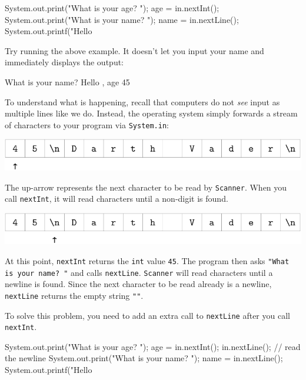 \documentclass[12pt]{book}
\theoremstyle{exercise}
\newcommand{\java}[1]{\lstinline{#1}} %
\begin{document}
\begin{code}
    System.out.print("What is your age? ");
    age = in.nextInt();
    System.out.print("What is your name? ");
    name = in.nextLine();
    System.out.printf("Hello %
\end{code}

Try running the above example.
It doesn't let you input your name and immediately displays the output:

\begin{stdout}
What is your name? Hello , age 45
\end{stdout}

To understand what is happening, recall that computers do not {\em see} input as multiple lines like we do.
Instead, the operating system simply forwards a stream of characters to your program via \java{System.in}:

\begin{center}
\includegraphics{figs/vader1.pdf}
\end{center}

The up-arrow represents the next character to be read by \java{Scanner}.
When you call \java{nextInt}, it will read characters until a non-digit is found.

\begin{center}
\includegraphics{figs/vader2.pdf}
\end{center}

At this point, \java{nextInt} returns the \java{int} value \java{45}.
The program then asks \java{"What is your name? "} and calls \java{nextLine}.
\java{Scanner} will read characters until a newline is found.
Since the next character to be read already is a newline, \java{nextLine} returns the empty string \java{""}.

To solve this problem, you need to add an extra call to \java{nextLine} after you call \java{nextInt}.

\begin{code}
    System.out.print("What is your age? ");
    age = in.nextInt();
    in.nextLine();  // read the newline
    System.out.print("What is your name? ");
    name = in.nextLine();
    System.out.printf("Hello %
\end{code}
\end{document}
